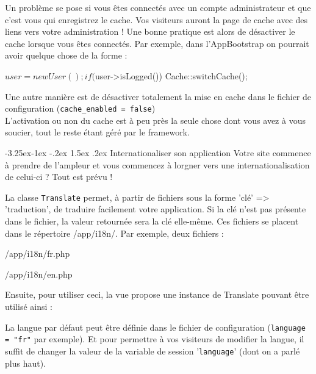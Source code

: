 \documentclass[a4paper,11pt]{article}
\makeatletter
\renewcommand{\subsection}{\@startsection{subsection}{2}{\z@}%
             {-3.25ex\@plus -1ex \@minus -.2ex}%
             {1.5ex \@plus .2ex}%
             {\color{bleuFonce}\normalfont\large\bfseries}}
\makeatother
\begin{document}
Un problème se pose si vous êtes connectés avec un compte administrateur et que c'est vous qui enregistrez le cache. Vos visiteurs auront la page de cache avec des liens vers votre administration ! Une bonne pratique est alors de désactiver le cache lorsque vous êtes connectés. Par exemple, dans l'AppBootstrap on pourrait avoir quelque chose de la forme :
\begin{PHP}
$user = new User();

if($user->isLogged()) {
  Cache::switchCache();
}
\end{PHP}

Une autre manière est de désactiver totalement la mise en cache dans le fichier de configuration (\texttt{cache\_enabled = false})\\

L'activation ou non du cache est à peu près la seule chose dont vous avez à vous soucier, tout le reste étant géré par le framework.

\subsection{Internationaliser son application}
Votre site commence à prendre de l'ampleur et vous commencez à lorgner vers une internationalisation de celui-ci ? Tout est prévu !

La classe \texttt{Translate} permet, à partir de fichiers sous la forme 'clé' => 'traduction', de traduire facilement votre application. Si la clé n'est pas présente dans le fichier, la valeur retournée sera la clé elle-même. Ces fichiers se placent dans le répertoire /app/i18n/. Par exemple, deux fichiers :

/app/i18n/fr.php
\begin{PHP}
return array(
  'home' => 'Accueil',
  'welcome' => 'Bienvenue !',
  'connection' => 'Connexion',
}
\end{PHP}

/app/i18n/en.php
\begin{PHP}
return array(
  'home' => 'Home',
  'welcome' => 'Welcome !',
  'connection' => 'Connection',
}
\end{PHP}

Ensuite, pour utiliser ceci, la vue propose une instance de Translate pouvant être utilisé ainsi :

La langue par défaut peut être définie dans le fichier de configuration (\texttt{language = "fr"} par exemple). Et pour permettre à vos visiteurs de modifier la langue, il suffit de changer la valeur de la variable de session '\texttt{language}' (dont on a parlé plus haut).
\end{document}
